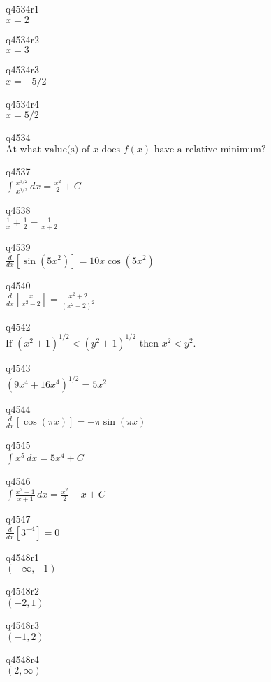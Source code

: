 q4534r1\\
\(\displaystyle x = 2 \)

q4534r2\\
\(\displaystyle x = 3 \)

q4534r3\\
\(\displaystyle x = -5/2 \)

q4534r4\\
\(\displaystyle x = 5/2 \)

q4534\\
\(\displaystyle \text{At what value(s) of } x \text{ does } f(x) \text{ have a relative minimum?} \)

q4537\\
\(\displaystyle \int \frac{x^{3/2}}{x^{1/2}}\,dx = \frac{x^2}{2} + C \)

q4538\\
\(\displaystyle \frac{1}{x} + \frac{1}{2} = \frac{1}{x+2} \)

q4539\\
\(\displaystyle \frac{d}{dx} [\sin(5x^2)] = 10x \cos(5x^2) \)

q4540\\
\(\displaystyle \frac{d}{dx} \left [ \frac{x}{x^2-2} \right ] = \frac{x^2+2}{(x^2-2)^2} \)

q4542\\
\(\displaystyle \text{If } (x^2+1)^{1/2} < (y^2 + 1)^{1/2} \text{ then } x^2 < y^2. \)

q4543\\
\(\displaystyle (9x^4 + 16x^4)^{1/2} = 5x^2 \)

q4544\\
\(\displaystyle \frac{d}{dx} [\cos(\pi x)] = -\pi \sin(\pi x) \)

q4545\\
\(\displaystyle \int x^5\,dx = 5x^4 + C \)

q4546\\
\(\displaystyle \int \frac{x^2-1}{x+1}\,dx = \frac{x^2}{2} - x + C \)

q4547\\
\(\displaystyle \frac{d}{dx} [3^{-4}] = 0 \)

q4548r1\\
\(\displaystyle (-\infty, -1) \)

q4548r2\\
\(\displaystyle (-2, 1) \)

q4548r3\\
\(\displaystyle (-1, 2) \)

q4548r4\\
\(\displaystyle (2, \infty) \)

